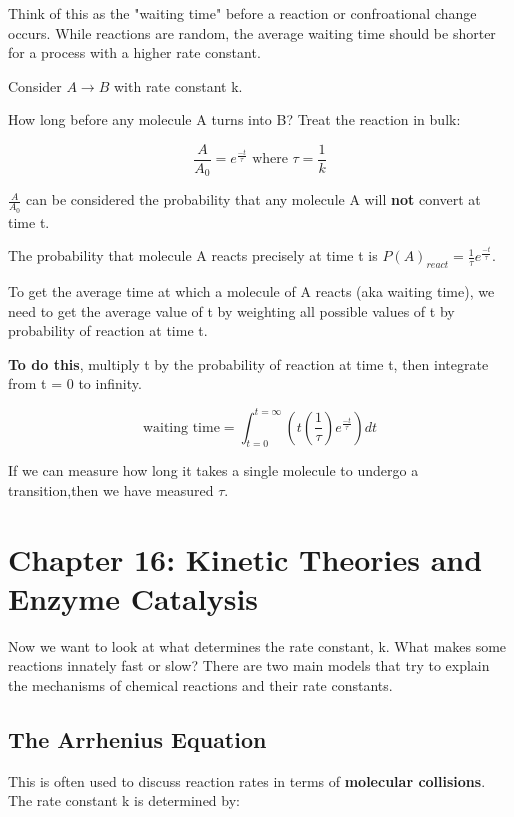 \documentclass[12pt, letterpaper]{article}
\begin{document}
Think of this as the "waiting time" before a reaction or confroational change occurs. 
While reactions are random, the average waiting time should be shorter for a process with a higher rate constant. 

Consider \( A \longrightarrow B \) with rate constant k. 

How long before any molecule A turns into B? Treat the reaction in bulk: 

\begin{equation}
    \frac{A}{A_0} = e^{\frac{-t}{\tau}} \text{ where } \tau = \frac{1}{k}
\end{equation}

$\frac{A}{A_0} $ can be considered the probability that any molecule A will \textbf{not} convert at time t. 

The probability that molecule A reacts precisely at time t is \( P(A)_{react} = \frac{1}{\tau} e^{\frac{-t}{\tau}} \).

To get the average time at which a molecule of A reacts (aka waiting time), we need
to get the average value of t by weighting all possible values of t by probability of reaction at time t. 

\textbf{To do this}, multiply t by the probability of reaction at time t, then integrate from t = 0 to infinity. 

\begin{equation}
    \text{waiting time} = \int_{t = 0}^{t = \infty}(t(\frac{1}{\tau})e^{\frac{-t}{\tau}})dt
\end{equation}

If we can measure how long it takes a single molecule to undergo a transition,then we have measured $\tau$. 

\newpage

\section*{Chapter 16: Kinetic Theories and Enzyme Catalysis}
Now we want to look at what determines the rate constant, k. What makes some reactions innately fast or slow?
There are two main models that try to explain the mechanisms of chemical reactions and their rate constants. 

\subsection*{The Arrhenius Equation}

This is often used to discuss reaction rates in terms of \textbf{molecular collisions}. 
The rate constant k is determined by:
\end{document}
